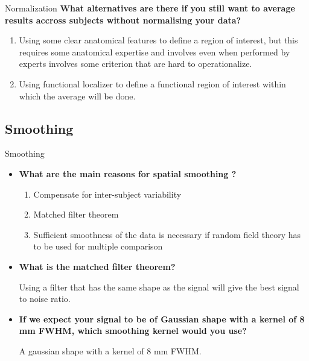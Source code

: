 \documentclass{beamer}
\begin{document}
\begin{frame}{Normalization}
\textbf{What alternatives are there if you still want to average results accross subjects without normalising your data?}
    
\smallskip     
    \begin{enumerate}
      \item Using some clear anatomical features to define a region of interest, but this requires some anatomical expertise and involves even when performed by experts involves some criterion that are hard to operationalize. 
      \item Using functional localizer to define a functional region of interest within which the average will be done.
    \end{enumerate}    
\end{frame}


\subsection[Smoothing]{Smoothing}

\begin{frame}{Smoothing}
  \begin{itemize}  
    \item \textbf{What are the main reasons for spatial smoothing ?}
  
\smallskip 
    \begin{enumerate}\footnotesize
      \item Compensate for inter-subject variability
      \item Matched filter theorem
      \item Sufficient smoothness of the data is necessary if random field theory has to be used for multiple comparison
    \end{enumerate}

\bigskip
    \item \textbf{What is the matched filter theorem?}

\smallskip   
Using a filter that has the same shape as the signal will give the best signal to noise ratio. 

\bigskip
    \item \textbf{If we expect your signal to be of Gaussian shape with a kernel of 8 mm FWHM, which smoothing kernel would you use?}

\smallskip   
A gaussian shape with a kernel of 8 mm FWHM.
    
  \end{itemize}
\end{frame}
\end{document}
